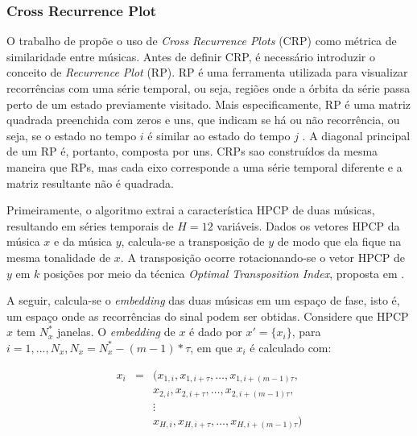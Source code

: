 \subsubsection{Cross Recurrence Plot}

O trabalho de  propõe o uso de \textit{Cross Recurrence Plots} (CRP) como métrica de similaridade entre músicas. Antes de definir CRP, é necessário introduzir o conceito de \textit{Recurrence Plot} (RP). RP é uma ferramenta utilizada para visualizar recorrências com uma série temporal, ou seja, regiões onde a órbita da série passa perto de um estado previamente visitado. Mais especificamente, RP é uma matriz quadrada preenchida com zeros e uns, que indicam se há ou não recorrência, ou seja, se o estado no tempo \({i}\) é similar ao estado do tempo \({j}\) \cite{eckmann1987, alligood1996}. A diagonal principal de um RP é, portanto, composta por uns. CRPs sao construídos da mesma maneira que RPs, mas cada eixo corresponde a uma série temporal diferente e a matriz resultante não é quadrada.

Primeiramente, o algoritmo extrai a característica HPCP \cite{gomez2006} de duas músicas, resultando em séries temporais de \({H = 12}\) variáveis. Dados os vetores HPCP da música \textbf{\({x}\)} e da música \textbf{\({y}\)}, calcula-se a transposição de \textbf{\({y}\)} de modo que ela fique na mesma tonalidade de \textbf{\({x}\)}. A transposição ocorre rotacionando-se o vetor HPCP de \textbf{\({y}\)} em \({k}\) posições por meio da técnica \textit{Optimal Transposition Index}, proposta em \cite{serra2009}.

A seguir, calcula-se o \textit{embedding} das duas músicas em um espaço de fase, isto é, um espaço onde as recorrências do sinal podem ser obtidas. Considere que  HPCP \textbf{\({x}\)} tem \({N_{x}^{*}}\) janelas. O \textit{embedding} de \textbf{\({x}\)} é dado por \({x' = \big\{x_{i}\big\}}\), para \({i = 1, ..., N_{x}, N_{x} = N_{x}^{*} - (m - 1)*\tau}\), em que \({x_{i}}\) é calculado com:

\begin{eqnarray} \label{embedding}
    x_{i} &=& (x_{1,i},x_{1,i+\tau}, \ldots, x_{1,i+(m-1)\tau}, \\
          & & x_{2,i},x_{2,i+\tau}, \ldots, x_{2,i+(m-1)\tau}, \nonumber \\
          & & \vdots \nonumber \\
          & & x_{H,i},x_{H,i+\tau}, \ldots, x_{H,i+(m-1)\tau}) \nonumber
\end{eqnarray}

